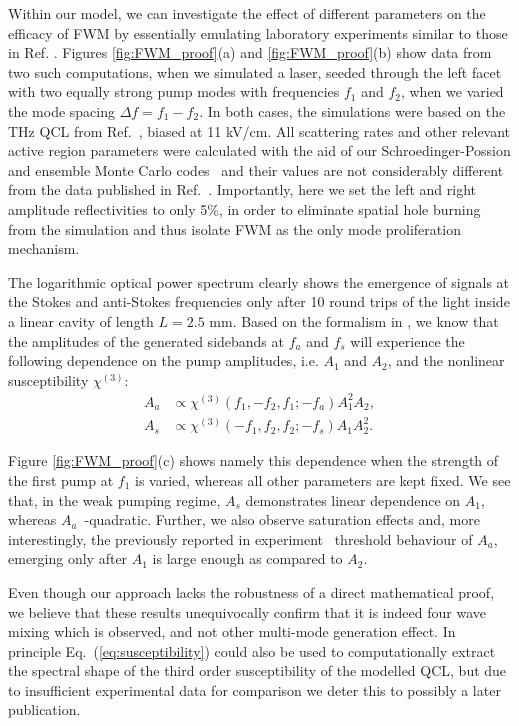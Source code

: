 \documentclass[journal]{IEEEtran}
\begin{document}
	Within our model, we can investigate the effect of different parameters on the efficacy of FWM by essentially emulating laboratory experiments similar to those in Ref. \cite{friedli2013four}. Figures \ref{fig:FWM_proof}(a) and \ref{fig:FWM_proof}(b) show data from two such computations, when we simulated a laser, seeded through the left facet with two equally strong pump modes with frequencies $f_1$ and $f_2$, when we varied the mode spacing  $\Delta f = f_1 - f_2$. In both cases, the simulations were based on the THz QCL from Ref.~\cite{burghoff2014terahertz}, biased at 11 kV/cm. All scattering rates and other relevant active region parameters were calculated with the aid of our Schroedinger-Possion and ensemble Monte Carlo codes~\cite{jirauschek2014modeling} and their values are not considerably different from the data published in Ref.~\cite{petz2016}. Importantly, here we set the left and right amplitude reflectivities to only 5\%, in order to eliminate spatial hole burning from the simulation and thus isolate FWM as the only mode proliferation mechanism.
	
	The logarithmic optical power spectrum clearly shows the emergence of signals at the Stokes and anti-Stokes frequencies only after 10 round trips of the light inside a linear cavity of length $L = 2.5$ mm.  Based on the formalism in \cite{sutherland2003handbook}, we know that the amplitudes of the generated sidebands at $f_a$ and $f_s$ will experience the following dependence on the pump amplitudes, i.e. $A_{1}$ and $A_{2}$, and the nonlinear susceptibility $\chi^{(3)}$:
	\begin{align}
	A_{a} &\propto \chi^{(3)}(f_1,-f_2,f_1;-f_a) A_{1}^2 A_{2}, \nonumber \\
	A_{s} &\propto \chi^{(3)}(-f_1,f_2,f_2;-f_s) A_{1}  A_{2}^2. \label{eq:susceptibility}
	\end{align}
	
	Figure \ref{fig:FWM_proof}(c) shows namely this dependence when the strength of the first pump at $f_1$ is varied, whereas all other parameters are kept fixed. We see that, in the weak pumping regime, $A_{s}$ demonstrates linear dependence on $A_{1}$, whereas $A_{a}$~-quadratic. Further, we also observe saturation effects and, more interestingly, the previously reported in experiment~\cite{friedli2013four} threshold behaviour of $A_{a}$, emerging only after $A_{1}$ is large enough as compared to $A_2$.
	
	Even though our approach lacks the robustness of a direct mathematical proof, we believe that these results unequivocally confirm that it is indeed four wave mixing which is observed, and not other multi-mode generation effect. In principle Eq.~(\ref{eq:susceptibility}) could also be used to computationally extract the spectral shape of the third order susceptibility of the modelled QCL, but due to insufficient experimental data for comparison we deter this to possibly a later publication. 
	
\end{document}
